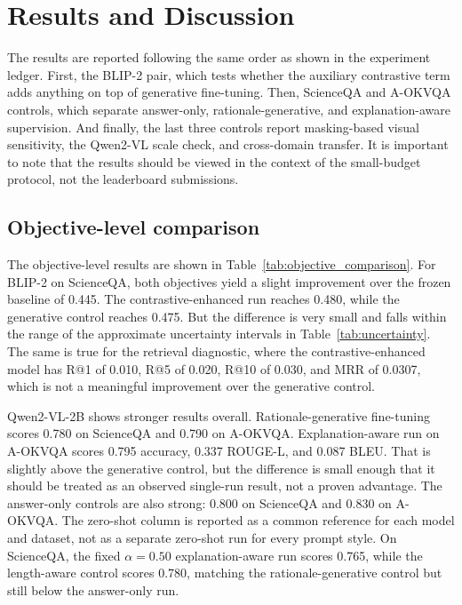 \documentclass[12pt,bibliography=totoc,listof=totoc,BCOR=5mm,DIV=12,oneside,open=any]{scrbook}
\begin{document}
\FloatBarrier
\chapter{Results and Discussion}
The results are reported following the same order as shown in the experiment ledger.
First, the BLIP-2 pair, which tests whether the auxiliary contrastive term adds anything on top of generative fine-tuning.
Then, ScienceQA and A-OKVQA controls, which separate answer-only, rationale-generative, and explanation-aware supervision.
And finally, the last three controls report masking-based visual sensitivity, the Qwen2-VL scale check, and cross-domain transfer.
It is important to note that the results should be viewed in the context of the small-budget protocol, not the leaderboard submissions.

\section{Objective-level comparison}
The objective-level results are shown in Table~\ref{tab:objective_comparison}.
For BLIP-2 on ScienceQA, both objectives yield a slight improvement over the frozen baseline of 0.445.
The contrastive-enhanced run reaches 0.480, while the generative control reaches 0.475.
But the difference is very small and falls within the range of the approximate uncertainty intervals in Table~\ref{tab:uncertainty}.
The same is true for the retrieval diagnostic, where the contrastive-enhanced model has R@1 of 0.010, R@5 of 0.020, R@10 of 0.030, and MRR of 0.0307, which is not a meaningful improvement over the generative control.

Qwen2-VL-2B shows stronger results overall.
Rationale-generative fine-tuning scores 0.780 on ScienceQA and 0.790 on A-OKVQA.
Explanation-aware run on A-OKVQA scores 0.795 accuracy, 0.337 ROUGE-L, and 0.087 BLEU.
That is slightly above the generative control, but the difference is small enough that it should be treated as an observed single-run result, not a proven advantage.
The answer-only controls are also strong: 0.800 on ScienceQA and 0.830 on A-OKVQA.
The zero-shot column is reported as a common reference for each model and dataset, not as a separate zero-shot run for every prompt style.
On ScienceQA, the fixed $\alpha=0.50$ explanation-aware run scores 0.765, while the length-aware control scores 0.780, matching the rationale-generative control but still below the answer-only run.
\end{document}
